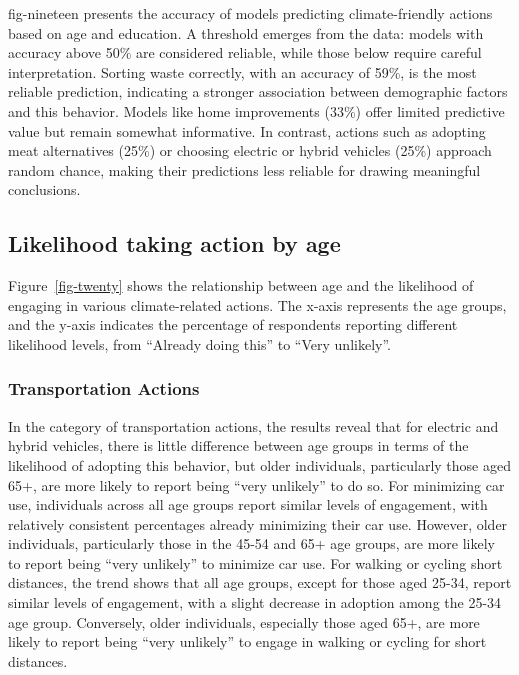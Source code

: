 \documentclass[
  letterpaper,
  DIV=11,
  numbers=noendperiod]{scrartcl}
\begin{document}
fig-nineteen presents the accuracy of models predicting climate-friendly
actions based on age and education. A threshold emerges from the data:
models with accuracy above 50\% are considered reliable, while those
below require careful interpretation. Sorting waste correctly, with an
accuracy of 59\%, is the most reliable prediction, indicating a stronger
association between demographic factors and this behavior. Models like
home improvements (33\%) offer limited predictive value but remain
somewhat informative. In contrast, actions such as adopting meat
alternatives (25\%) or choosing electric or hybrid vehicles (25\%)
approach random chance, making their predictions less reliable for
drawing meaningful conclusions.

\subsection{Likelihood taking action by
age}\label{likelihood-taking-action-by-age}

Figure~\ref{fig-twenty} shows the relationship between age and the
likelihood of engaging in various climate-related actions. The x-axis
represents the age groups, and the y-axis indicates the percentage of
respondents reporting different likelihood levels, from ``Already doing
this'' to ``Very unlikely''.

\subsubsection{Transportation Actions}\label{transportation-actions-1}

In the category of transportation actions, the results reveal that for
electric and hybrid vehicles, there is little difference between age
groups in terms of the likelihood of adopting this behavior, but older
individuals, particularly those aged 65+, are more likely to report
being ``very unlikely'' to do so. For minimizing car use, individuals
across all age groups report similar levels of engagement, with
relatively consistent percentages already minimizing their car use.
However, older individuals, particularly those in the 45-54 and 65+ age
groups, are more likely to report being ``very unlikely'' to minimize
car use. For walking or cycling short distances, the trend shows that
all age groups, except for those aged 25-34, report similar levels of
engagement, with a slight decrease in adoption among the 25-34 age
group. Conversely, older individuals, especially those aged 65+, are
more likely to report being ``very unlikely'' to engage in walking or
cycling for short distances.
\end{document}
